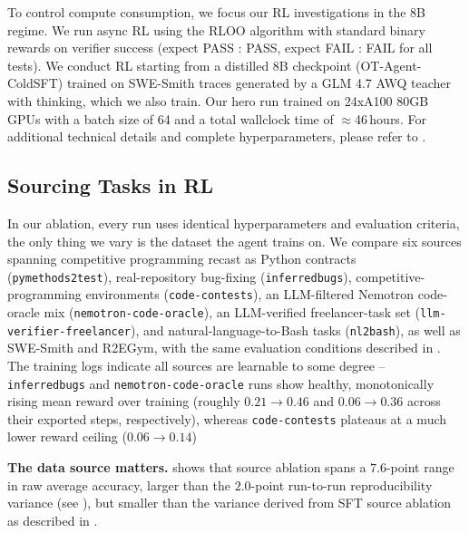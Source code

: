 \documentclass{llmxive}
\begin{document}
To control compute consumption, we focus our RL investigations in the 8B regime. We run async RL using the RLOO algorithm \citep{ahmadian2024back} with standard binary rewards on verifier success (expect PASS : PASS, expect FAIL : FAIL for all tests). We conduct RL starting from a distilled 8B checkpoint (OT-Agent-ColdSFT) trained on SWE-Smith traces generated by a GLM 4.7 AWQ teacher with thinking, which we also train. Our hero run trained on 24xA100 80GB GPUs with a batch size of 64 and a total wallclock time of $\approx$46\,hours. For additional technical details and complete hyperparameters, please refer to .

\subsection{Sourcing Tasks in RL}
\label{sec:rl-data-ablation}



In our ablation, every run uses identical hyperparameters and evaluation criteria, the only thing we vary is the dataset the agent trains on. We compare six sources spanning competitive programming recast as Python contracts (\texttt{pymethods2test}), real-repository bug-fixing (\texttt{inferredbugs}), competitive-programming environments (\texttt{code-contests}), an LLM-filtered Nemotron code-oracle mix (\texttt{nemotron-code-oracle}), an LLM-verified freelancer-task set (\texttt{llm-verifier-freelancer}), and natural-language-to-Bash tasks (\texttt{nl2bash}), as well as SWE-Smith and R2EGym, with the same evaluation conditions described in . The training logs indicate all sources are learnable to some degree -- \texttt{inferredbugs} and \texttt{nemotron-code-oracle} runs show healthy, monotonically rising mean reward over training (roughly $0.21\!\to\!0.46$ and $0.06\!\to\!0.36$ across their exported steps, respectively), whereas \texttt{code-contests} plateaus at a much lower reward ceiling ($0.06\!\to\!0.14$)

\textbf{The data source matters.}  shows that source ablation spans a $7.6$-point range in raw average accuracy, larger than the $2.0$-point run-to-run reproducibility variance (see ), but smaller than the variance derived from SFT source ablation as described in .
\end{document}
